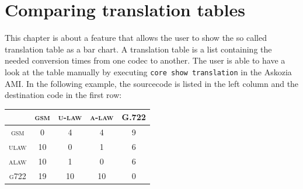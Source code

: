 \section{Comparing translation tables}
\label{sec:translation-tables}




This chapter is about a feature that allows the user to show the so called translation table as a bar chart.
A translation table is a list containing the needed conversion times from one codec to another.
The user is able to have a look at the table manually by executing \texttt{core show translation} in the Askozia AMI.
In the following example, the sourcecode is listed in the left column and the destination code in the first row:

\begin {table} [htpb]
\centering
\begin{tabular}{|c|c|c|c|c|} \hline
	 & \textsc{gsm} & \textsc{u-law} & \textsc{a-law} & \textsc{G.722} \\ \hline \hline
	\textsc{gsm} & 0 & 4 & 4 & 9 \\
	\textsc{ulaw} & 10 & 0 & 1 & 6 \\
	\textsc{alaw} & 10 & 1 & 0 & 6 \\
	\textsc{g722} & 19 & 10 & 10 & 0 \\
	\hline
\end{tabular}
\end{table}

